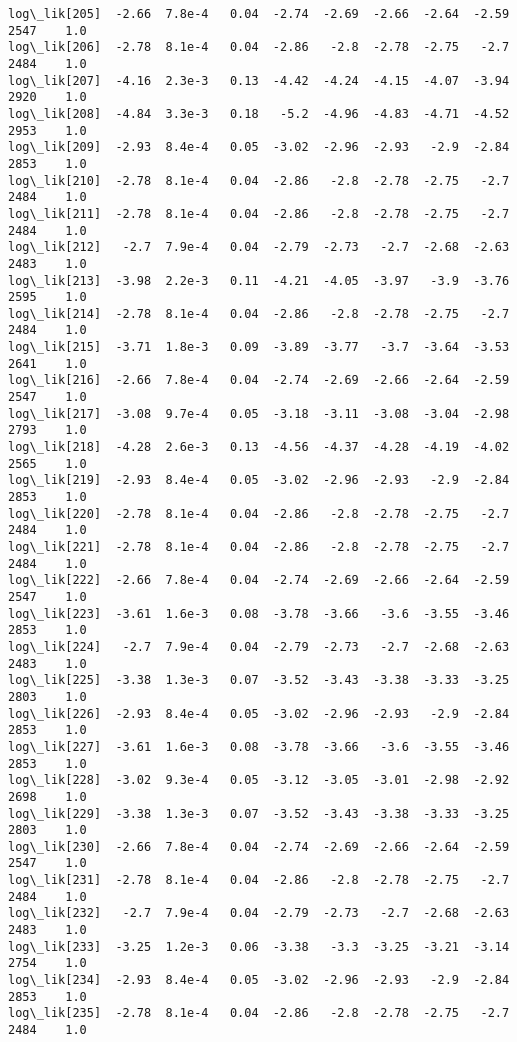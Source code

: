 \documentclass[11pt]{article}
\begin{document}
\begin{Verbatim}[commandchars=\\\{\}]
log\_lik[205]  -2.66  7.8e-4   0.04  -2.74  -2.69  -2.66  -2.64  -2.59   2547    1.0
log\_lik[206]  -2.78  8.1e-4   0.04  -2.86   -2.8  -2.78  -2.75   -2.7   2484    1.0
log\_lik[207]  -4.16  2.3e-3   0.13  -4.42  -4.24  -4.15  -4.07  -3.94   2920    1.0
log\_lik[208]  -4.84  3.3e-3   0.18   -5.2  -4.96  -4.83  -4.71  -4.52   2953    1.0
log\_lik[209]  -2.93  8.4e-4   0.05  -3.02  -2.96  -2.93   -2.9  -2.84   2853    1.0
log\_lik[210]  -2.78  8.1e-4   0.04  -2.86   -2.8  -2.78  -2.75   -2.7   2484    1.0
log\_lik[211]  -2.78  8.1e-4   0.04  -2.86   -2.8  -2.78  -2.75   -2.7   2484    1.0
log\_lik[212]   -2.7  7.9e-4   0.04  -2.79  -2.73   -2.7  -2.68  -2.63   2483    1.0
log\_lik[213]  -3.98  2.2e-3   0.11  -4.21  -4.05  -3.97   -3.9  -3.76   2595    1.0
log\_lik[214]  -2.78  8.1e-4   0.04  -2.86   -2.8  -2.78  -2.75   -2.7   2484    1.0
log\_lik[215]  -3.71  1.8e-3   0.09  -3.89  -3.77   -3.7  -3.64  -3.53   2641    1.0
log\_lik[216]  -2.66  7.8e-4   0.04  -2.74  -2.69  -2.66  -2.64  -2.59   2547    1.0
log\_lik[217]  -3.08  9.7e-4   0.05  -3.18  -3.11  -3.08  -3.04  -2.98   2793    1.0
log\_lik[218]  -4.28  2.6e-3   0.13  -4.56  -4.37  -4.28  -4.19  -4.02   2565    1.0
log\_lik[219]  -2.93  8.4e-4   0.05  -3.02  -2.96  -2.93   -2.9  -2.84   2853    1.0
log\_lik[220]  -2.78  8.1e-4   0.04  -2.86   -2.8  -2.78  -2.75   -2.7   2484    1.0
log\_lik[221]  -2.78  8.1e-4   0.04  -2.86   -2.8  -2.78  -2.75   -2.7   2484    1.0
log\_lik[222]  -2.66  7.8e-4   0.04  -2.74  -2.69  -2.66  -2.64  -2.59   2547    1.0
log\_lik[223]  -3.61  1.6e-3   0.08  -3.78  -3.66   -3.6  -3.55  -3.46   2853    1.0
log\_lik[224]   -2.7  7.9e-4   0.04  -2.79  -2.73   -2.7  -2.68  -2.63   2483    1.0
log\_lik[225]  -3.38  1.3e-3   0.07  -3.52  -3.43  -3.38  -3.33  -3.25   2803    1.0
log\_lik[226]  -2.93  8.4e-4   0.05  -3.02  -2.96  -2.93   -2.9  -2.84   2853    1.0
log\_lik[227]  -3.61  1.6e-3   0.08  -3.78  -3.66   -3.6  -3.55  -3.46   2853    1.0
log\_lik[228]  -3.02  9.3e-4   0.05  -3.12  -3.05  -3.01  -2.98  -2.92   2698    1.0
log\_lik[229]  -3.38  1.3e-3   0.07  -3.52  -3.43  -3.38  -3.33  -3.25   2803    1.0
log\_lik[230]  -2.66  7.8e-4   0.04  -2.74  -2.69  -2.66  -2.64  -2.59   2547    1.0
log\_lik[231]  -2.78  8.1e-4   0.04  -2.86   -2.8  -2.78  -2.75   -2.7   2484    1.0
log\_lik[232]   -2.7  7.9e-4   0.04  -2.79  -2.73   -2.7  -2.68  -2.63   2483    1.0
log\_lik[233]  -3.25  1.2e-3   0.06  -3.38   -3.3  -3.25  -3.21  -3.14   2754    1.0
log\_lik[234]  -2.93  8.4e-4   0.05  -3.02  -2.96  -2.93   -2.9  -2.84   2853    1.0
log\_lik[235]  -2.78  8.1e-4   0.04  -2.86   -2.8  -2.78  -2.75   -2.7   2484    1.0

\end{Verbatim}
\end{document}
